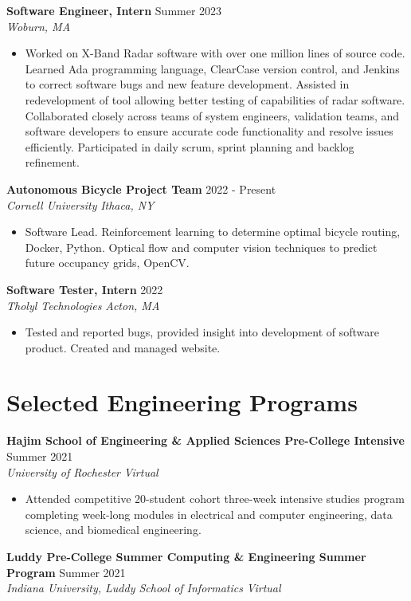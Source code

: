 \documentclass[letterpaper,8pt]{article}
\newcommand{\position}[3]{
    \hspace{0.5cm} \normalsize \textbf{#1} 
    \hfill {\small #2}
    \\
    \hfill \small \textit{#3}
    \\
}
\newcommand{\resumeEntry}[4]{
    \vspace{4pt}
    \large \textbf{#1}
    \normalsize \hfill #2
    \\
    \textit{#3} \hfill \textit{#4}
    \vspace{1pt}
}
\newcommand{\itemsBegin}{
    \begin{itemize}[leftmargin=0.2in, labelsep=0.05in, itemsep=0pt, parsep=1pt, topsep=0pt, partopsep=0pt]
}
\newcommand{\itemsEnd}{\end{itemize}}
\begin{document}
    \position{Software Engineer, Intern}{Summer 2023}{Woburn, MA}
    \itemsBegin
        \item Worked on X-Band Radar software with over one million lines of source code. Learned Ada programming language, ClearCase version control, and Jenkins to correct software bugs and new feature development. Assisted in redevelopment of tool allowing better testing of capabilities of radar software. Collaborated closely across teams of system engineers, validation teams, and software developers to ensure accurate code functionality and resolve issues efficiently. Participated in daily scrum, sprint planning and backlog refinement.
    \itemsEnd

    \resumeEntry
        {Autonomous Bicycle Project Team}
        {2022 - Present}
        {Cornell University}
        {Ithaca, NY}

    \itemsBegin
        \item Software Lead. Reinforcement learning to determine optimal bicycle routing, Docker, Python. Optical flow and computer vision techniques to predict future occupancy grids, OpenCV.
    \itemsEnd

    \resumeEntry
        {Software Tester, Intern}
        {2022}
        {Tholyl Technologies}
        {Acton, MA}

    \itemsBegin
        \item Tested and reported bugs, provided insight into development of software product. Created and managed website.
    \itemsEnd

\section{Selected Engineering Programs}


    \resumeEntry
        {Hajim School of Engineering \& Applied Sciences Pre-College Intensive}
        {Summer 2021}
        {University of Rochester}
        {Virtual}

    \itemsBegin
        \item Attended competitive 20-student cohort three-week intensive studies program completing week-long modules in electrical and computer engineering, data science, and biomedical engineering.
    \itemsEnd

    \resumeEntry
        {Luddy Pre-College Summer Computing \& Engineering Summer Program}
        {Summer 2021}
        {Indiana University, Luddy School of Informatics}
        {Virtual}
\end{document}
